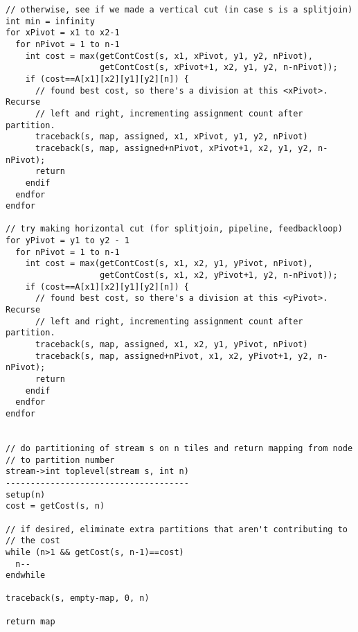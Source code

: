 \begin{verbatim}
// otherwise, see if we made a vertical cut (in case s is a splitjoin)
int min = infinity
for xPivot = x1 to x2-1
  for nPivot = 1 to n-1
    int cost = max(getContCost(s, x1, xPivot, y1, y2, nPivot),
                   getContCost(s, xPivot+1, x2, y1, y2, n-nPivot));
    if (cost==A[x1][x2][y1][y2][n]) {
      // found best cost, so there's a division at this <xPivot>.  Recurse
      // left and right, incrementing assignment count after partition.
      traceback(s, map, assigned, x1, xPivot, y1, y2, nPivot)
      traceback(s, map, assigned+nPivot, xPivot+1, x2, y1, y2, n-nPivot);
      return
    endif
  endfor
endfor

// try making horizontal cut (for splitjoin, pipeline, feedbackloop)
for yPivot = y1 to y2 - 1
  for nPivot = 1 to n-1
    int cost = max(getContCost(s, x1, x2, y1, yPivot, nPivot),
                   getContCost(s, x1, x2, yPivot+1, y2, n-nPivot));
    if (cost==A[x1][x2][y1][y2][n]) {
      // found best cost, so there's a division at this <yPivot>.  Recurse
      // left and right, incrementing assignment count after partition.
      traceback(s, map, assigned, x1, x2, y1, yPivot, nPivot)
      traceback(s, map, assigned+nPivot, x1, x2, yPivot+1, y2, n-nPivot);
      return
    endif
  endfor
endfor


// do partitioning of stream s on n tiles and return mapping from node
// to partition number
stream->int toplevel(stream s, int n)
-------------------------------------
setup(n)
cost = getCost(s, n)

// if desired, eliminate extra partitions that aren't contributing to
// the cost
while (n>1 && getCost(s, n-1)==cost)
  n--
endwhile

traceback(s, empty-map, 0, n)

return map

\end{verbatim}
